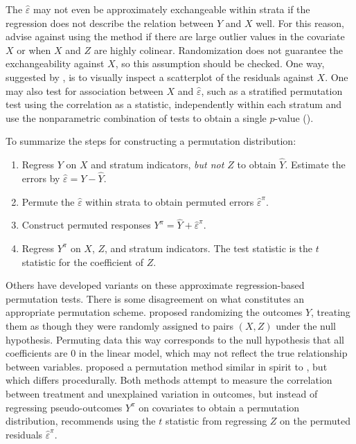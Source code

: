 \documentclass[12pt]{article}
\begin{document}
The $\hat{\varepsilon}$ may not even be approximately exchangeable within strata if the regression does not describe the relation between $Y$ and $X$ well.
For this reason, \cite{freedman_nonstochastic_1983} advise against using the method if there are large outlier values in the covariate $X$ or when $X$ and $Z$ are highly colinear.
Randomization does not guarantee the exchangeability against $X$, so this assumption should be checked.
One way, suggested by \cite{freedman_nonstochastic_1983}, is to visually inspect a scatterplot of the residuals against $X$.
One may also test for association between $X$ and $\hat{\varepsilon}$, such as a stratified permutation test using the correlation as a statistic, independently within each stratum and use the nonparametric combination of tests to obtain a single $p$-value (\cite{pesarin_permutation_2010}).


To summarize the steps for constructing a permutation distribution:

\begin{enumerate}
\item Regress $Y$ on $X$ and stratum indicators, \textit{but not $Z$} to obtain $\hat{Y}$. Estimate the errors by $\hat{\varepsilon} = Y - \hat{Y}$.
\item Permute the $\hat{\varepsilon}$ within strata to obtain permuted errors $\hat{\varepsilon}^\pi$.
\item Construct permuted responses $Y^\pi = \hat{Y}+ \hat{\varepsilon}^\pi$.
\item Regress $Y^\pi$ on $X$, $Z$, and stratum indicators. The test statistic is the $t$ statistic for the coefficient of $Z$.
\end{enumerate}


Others have developed variants on these approximate regression-based permutation tests. 
There is some disagreement on what constitutes an appropriate permutation scheme.
\cite{manly_randomization_2006} proposed randomizing the outcomes $Y$, treating them as though they were randomly assigned to pairs $(X, Z)$ under the null hypothesis.
Permuting data this way corresponds to the null hypothesis that all coefficients are 0 in the linear model, which may not reflect the true relationship between variables.
\cite{kennedy_randomization_1995} proposed a permutation method similar in spirit to \cite{freedman_nonstochastic_1983}, but which differs procedurally.
Both methods attempt to measure the correlation between treatment and unexplained variation in outcomes, but
instead of regressing pseudo-outcomes $Y^\pi$ on covariates to obtain a permutation distribution, \cite{kennedy_randomization_1995} recommends using the $t$ statistic from regressing $Z$ on the permuted residuals $\hat{\varepsilon}^\pi$. 
\end{document}
